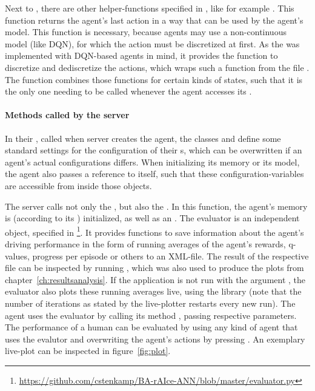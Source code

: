 \noindent Next to , there are other helper-functions specified in , like for example . This function returns the agent's last action in a way that can be used by the agent's model. This function is necessary, because agents may use a non-continuous model (like DQN), for which the action must be discretized at first. As the  was implemented with DQN-based agents in mind, it provides the function to discretize and dediscretize the actions, which wraps such a function from the file . The function  combines those functions for certain kinds of states, such that it is the only one needing to be called whenever the agent accesses its .

\paragraph{Methods called by the server}

In their , called when server creates the agent, the classes  and  define some standard settings for the configuration of their s, which can be overwritten if an agent's actual configurations differs. When initializing its memory or its model, the agent also passes a reference to itself, such that these configuration-variables are accessible from inside those objects. 

The server calls not only the , but also the . In this function, the agent's memory is (according to its ) initialized, as well as an . The evaluator is an independent object, specified in \footnote{\url{https://github.com/cstenkamp/BA-rAIce-ANN/blob/master/evaluator.py}}. It provides functions to save information about the agent's driving performance in the form of running averages of the agent's rewards, q-values, progress per episode or others to an XML-file. The result of the respective file can be inspected by running , which was also used to produce the plots from chapter~\ref{ch:resultsanalysis}. If the application is not run with the argument , the evaluator also plots these running averages live, using the library  (note that the number of iterations as stated by the live-plotter restarts every new run). The agent uses the evaluator by calling its method , passing respective parameters. The performance of a human can be evaluated by using any kind of agent that uses the evalutor and overwriting the agent's actions by pressing . An exemplary live-plot can be inspected in figure~\ref{fig:plot}.

